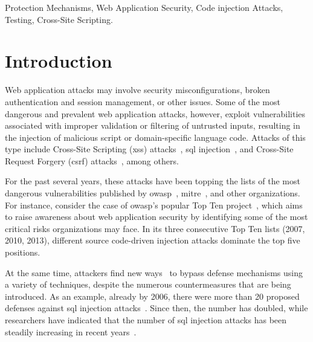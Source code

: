 \documentclass[conference]{IEEEtran}
\begin{document}
\begin{IEEEkeywords}
Protection Mechanisms, Web Application Security, Code injection Attacks,
Testing, Cross-Site Scripting.
\end{IEEEkeywords}

\IEEEpeerreviewmaketitle

\section{Introduction}

Web application attacks may involve security misconfigurations, broken
authentication and session management, or other issues. Some of the
most dangerous and prevalent web application attacks, however,
exploit vulnerabilities associated with improper validation or filtering
of untrusted inputs, resulting in the injection of malicious
script or domain-specific language code.
Attacks of this type include Cross-Site Scripting ({\sc xss})
attacks~\cite{SG07}, {\sc sql} injection~\cite{RL12b}, and
Cross-Site Request Forgery ({\sc csrf}) attacks~\cite{LZRL09}, among
others.

For the past several years,
these attacks have been topping the lists of the most dangerous vulnerabilities
published by {\sc owasp}~\cite{OWASPtop10},
{\sc mitre}~\cite{MITREtop25}, and other organizations.
For instance, consider the case of {\sc owasp}'s popular Top Ten
project~\cite{OWASPtop10},
which aims to raise awareness about web application security by
identifying some of the most critical risks organizations may face.
In its three consecutive Top Ten lists (2007, 2010, 2013), different source
code-driven injection attacks dominate the top five positions.

At the same time, attackers find new ways~\cite{HNSHS12,DKH14}
to bypass defense mechanisms using a variety of techniques,
despite the numerous countermeasures that are being introduced.
As an example, already by 2006,
there were more than 20 proposed defenses
against {\sc sql} injection attacks~\cite{HVO06}.
Since then, the number has doubled, while researchers have indicated that
the number of {\sc sql} injection attacks has been steadily
increasing in recent years~\cite{SSL12}.
\end{document}

